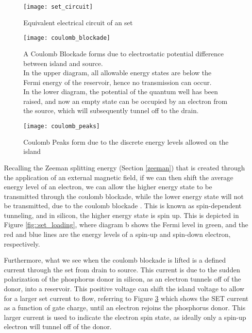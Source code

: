 	\begin{figure}[htbp!]
		\centering
		\texttt{[image: set\_circuit]}
		\caption[Equivalent circuit of an \gls{set}]{Equivalent electrical circuit of an \gls{set}\cite{devoret2000amplifying}}
		\label{fig::set_circuit}
	\end{figure}
	
	\begin{figure}[htbp!]
		\centering
		\texttt{[image: coulomb\_blockade]}
		\caption[A Coulomb Blockade]{A Coulomb Blockade \cite{coulomb_blockade} forms due to electrostatic potential difference between island and source.\\ In the upper diagram, all allowable energy states are below the Fermi energy of the reservoir, hence no transmission can occur.\\ In the lower diagram, the potential of the quantum well has been raised, and now an empty state can be occupied by an electron from the source, which will subsequently tunnel off to the drain.}
		\label{fig::coulomb_blockade}
	\end{figure}
	
	\begin{figure}[htbp!]
		\centering
		\texttt{[image: coulomb\_peaks]}
		\caption[Coulomb Peaks]{Coulomb Peaks form due to the discrete energy levels allowed on the island\cite{elec9705_lecture}}
		\label{fig::coulomb_peaks}
	\end{figure}
	
	
	
	Recalling the Zeeman splitting energy (Section \ref{zeeman}) that is created through the application of an external magnetic field, if we can then shift the average energy level of an electron, we can allow the higher energy state to be transmitted through the coulomb blockade, while the lower energy state will not be transmitted, due to the coulomb blockade . This is known as spin-dependent tunneling, and in silicon, the higher energy state is spin up. This is depicted in Figure \ref{fig::set_loading}, where diagram b shows the Fermi level in green, and the red and blue lines are the energy levels of a spin-up and spin-down electron, respectively. 
	
	Furthermore, what we see when the coulomb blockade is lifted is a defined current through the \gls{set} from drain to source. This current is due to the sudden polarization of the phosphorus donor in silicon, as an electron tunnels off of the donor, into a reservoir. This positive voltage can shift the island voltage to allow for a larger \gls{set} current to flow, referring to Figure \ref{fig::coulomb_peaks} which shows the SET current as a function of gate charge, until an electron rejoins the phosphorus donor. This larger current is used to indicate the electron spin state, as ideally only a spin-up electron will tunnel off of the donor.
	
